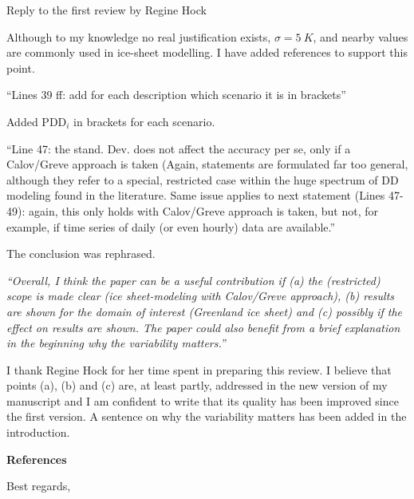 \documentclass{letter}
\newcommand{\rev}[0]{\color{blue!50!black}\it}
\newcommand{\textrev}[1]{{\rev``#1''}}
\newcommand{\revpoint}[1]{{\rev\item``#1''}}
\begin{document}
\begin{letter}{Reply to the first review by Regine Hock}
\begin{enumerate}[resume]
    Although to my knowledge no real justification exists, $\sigma = 5~K$, and nearby values are commonly used in ice-sheet modelling. I have added references to support this point.

    \revpoint{Lines 39 ff: add for each description which scenario it is in brackets}

    Added $\textrm{PDD}_i$ in brackets for each scenario.

    \revpoint{Line 47: the stand. Dev. does not affect the accuracy per se, only if a Calov/Greve approach is taken (Again, statements are formulated far too general, although they refer to a special, restricted case within the huge spectrum of DD modeling found in the literature. Same issue applies to next statement (Lines 47- 49): again, this only holds with Calov/Greve approach is taken, but not, for example, if time series of daily (or even hourly) data are available.}

    The conclusion was rephrased.

\end{enumerate}


\textrev{Overall, I think the paper can be a useful contribution if (a) the (restricted) scope is made clear (ice sheet-modeling with Calov/Greve approach), (b) results are shown for the domain of interest (Greenland ice sheet) and (c) possibly if the effect on results are shown. The paper could also benefit from a brief explanation in the beginning why the variability matters.}

I thank Regine Hock for her time spent in preparing this review. I believe that points (a), (b) and (c) are, at least partly, addressed in the new version of my manuscript and I am confident to write that its quality has been improved since the first version. A sentence on why the variability matters has been added in the introduction.

\textbf{References}



\closing{Best regards,}

\end{letter}
\end{document}

